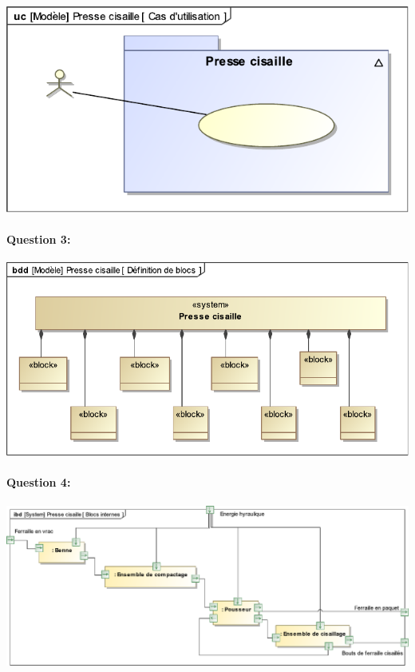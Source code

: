 \begin{center}
 \includegraphics[width=0.8\linewidth]{img/use_case_vierge}
\end{center}

\newpage

\paragraph{Question 3:}

\begin{center}
 \includegraphics[width=0.8\linewidth]{img/BDD_vierge}
\end{center}

\paragraph{Question 4:}

\begin{center}
 \includegraphics[width=0.8\linewidth]{img/Blocs_internes_vierge}
\end{center}


